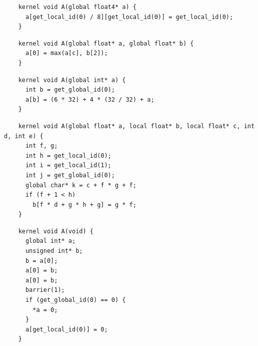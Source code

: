 \newsavebox{\BeignetScalarizeInsert}
\begin{lrbox}{\BeignetScalarizeInsert}
  \hspace{1.5em}
  \begin{lstlisting}
    kernel void A(global float4* a) {
      a[get_local_id(0) / 8][get_local_id(0)] = get_local_id(0);
    }
  \end{lstlisting}
\end{lrbox}

\newsavebox{\OclgrindUncorrectedTypos}
\begin{lrbox}{\OclgrindUncorrectedTypos}
  \hspace{1.5em}
  \begin{lstlisting}
    kernel void A(global float* a, global float* b) {
      a[0] = max(a[c], b[2]);
    }
  \end{lstlisting}
\end{lrbox}

\newsavebox{\BeignetPtrIntSpin}
\begin{lrbox}{\BeignetPtrIntSpin}
  \hspace{1.5em}
  \begin{lstlisting}
    kernel void A(global int* a) {
      int b = get_global_id(0);
      a[b] = (6 * 32) + 4 * (32 / 32) + a;
    }
  \end{lstlisting}
\end{lrbox}

\newsavebox{\NvidiaCompileSegfault}
\begin{lrbox}{\NvidiaCompileSegfault}
  \hspace{1.5em}
  \begin{lstlisting}
    kernel void A(global float* a, local float* b, local float* c, int d, int e) {
      int f, g;
      int h = get_local_id(0);
      int i = get_local_id(1);
      int j = get_global_id(0);
      global char* k = c + f * g + f;
      if (f + 1 < h)
        b[f * d + g * h + g] = g * f;
    }
  \end{lstlisting}
\end{lrbox}

\newsavebox{\XeonPhiSegfault}
\begin{lrbox}{\XeonPhiSegfault}
  \hspace{1.5em}
  \begin{lstlisting}
    kernel void A(void) {
      global int* a;
      unsigned int* b;
      b = a[0];
      a[0] = b;
      a[0] = b;
      barrier(1);
      if (get_global_id(0) == 0) {
        *a = 0;
      }
      a[get_local_id(0)] = 0;
    }
  \end{lstlisting}
\end{lrbox}


